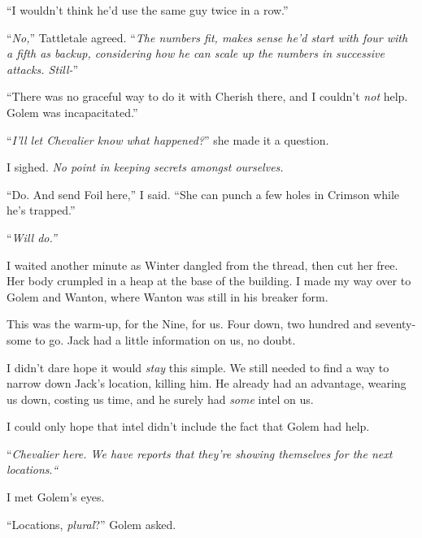 ``I wouldn't think he'd use the same guy twice in a row.''



``\emph{No,}'' Tattletale agreed.  ``\emph{The numbers fit, makes sense he'd start with four with a fifth as backup, considering how he can scale up the numbers in successive attacks.  Still-}''



``There was no graceful way to do it with Cherish there, and I couldn't \emph{not} help.  Golem was incapacitated.''



``\emph{I'll let Chevalier know what happened?}'' she made it a question.



I sighed.  \emph{No point in keeping secrets amongst ourselves.}



``Do.  And send Foil here,'' I said.  ``She can punch a few holes in Crimson while he's trapped.''



``\emph{Will do.''}



I waited another minute as Winter dangled from the thread, then cut her free.  Her body crumpled in a heap at the base of the building.  I made my way over to Golem and Wanton, where Wanton was still in his breaker form.



This was the warm-up, for the Nine, for us.  Four down, two hundred and seventy-some to go.  Jack had a little information on us, no doubt.



I didn't dare hope it would \emph{stay} this simple.  We still needed to find a way to narrow down Jack's location, killing him.  He already had an advantage, wearing us down, costing us time, and he surely had \emph{some} intel on us.



I could only hope that intel didn't include the fact that Golem had help.



``\emph{Chevalier here.  We have reports that they're showing themselves for the next locations}.\emph{``}



I met Golem's eyes.



``Locations, \emph{plural}?''  Golem asked.



